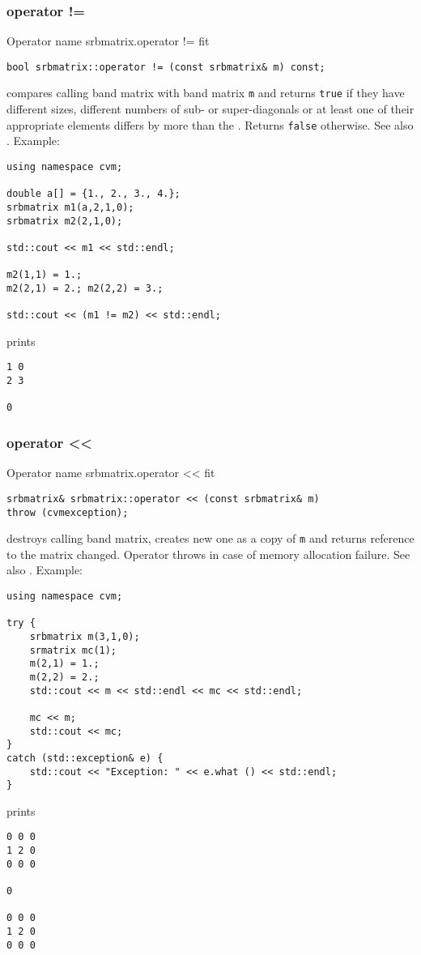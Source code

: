 \subsubsection{operator !=}
Operator%
\pdfdest name {srbmatrix.operator !=} fit
\begin{verbatim}
bool srbmatrix::operator != (const srbmatrix& m) const;
\end{verbatim}
compares  calling band matrix with  band matrix \verb"m"
and returns \verb"true" if they have different sizes,
different numbers of sub- or super-diagonals
or at least one of their appropriate elements
differs by more than the
.
Returns \verb"false" otherwise.
See also .
Example:
\begin{Verbatim}
using namespace cvm;

double a[] = {1., 2., 3., 4.};
srbmatrix m1(a,2,1,0);
srbmatrix m2(2,1,0);

std::cout << m1 << std::endl;

m2(1,1) = 1.; 
m2(2,1) = 2.; m2(2,2) = 3.;

std::cout << (m1 != m2) << std::endl;
\end{Verbatim}
prints
\begin{Verbatim}
1 0
2 3

0
\end{Verbatim}
\newpage




\subsubsection{operator <{}<}
Operator%
\pdfdest name {srbmatrix.operator <<} fit
\begin{verbatim}
srbmatrix& srbmatrix::operator << (const srbmatrix& m)
throw (cvmexception);
\end{verbatim}
destroys  calling band matrix, creates  new one as a copy of \verb"m"
and returns  reference to
the matrix changed.
Operator throws  
in case of memory allocation failure.
See also .
Example:
\begin{Verbatim}
using namespace cvm;

try {
    srbmatrix m(3,1,0);
    srmatrix mc(1);
    m(2,1) = 1.;
    m(2,2) = 2.;
    std::cout << m << std::endl << mc << std::endl;

    mc << m;
    std::cout << mc;
}
catch (std::exception& e) {
    std::cout << "Exception: " << e.what () << std::endl;
}
\end{Verbatim}
prints
\begin{Verbatim}
0 0 0
1 2 0
0 0 0

0

0 0 0
1 2 0
0 0 0
\end{Verbatim}
\newpage




